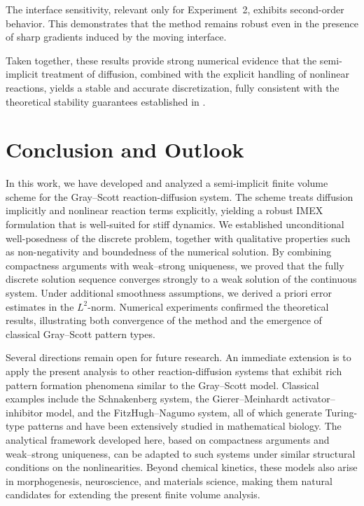 \documentclass[11pt, a4paper]{amsart}
\numberwithin{equation}{section}
\begin{document}
The interface sensitivity, relevant only for Experiment~2, exhibits second-order behavior. This demonstrates that the method remains robust even in the presence of sharp gradients induced by the moving interface.

Taken together, these results provide strong numerical evidence that the semi-implicit treatment of diffusion, combined with the explicit handling of nonlinear reactions, yields a stable and accurate discretization, fully consistent with the theoretical stability guarantees established in .

	
	
	\section{Conclusion and Outlook}\label{sec:conclusion}
	
	In this work, we have developed and analyzed a semi-implicit finite volume scheme for the Gray--Scott reaction-diffusion system. The scheme treats diffusion implicitly and nonlinear reaction terms explicitly, yielding a robust IMEX formulation that is well-suited for stiff dynamics. We established unconditional well-posedness of the discrete problem, together with qualitative properties such as non-negativity and boundedness of the numerical solution. By combining compactness arguments with weak--strong uniqueness, we proved that the fully discrete solution sequence converges strongly to a weak solution of the continuous system. Under additional smoothness assumptions, we derived a priori error estimates in the $L^2$-norm. Numerical experiments confirmed the theoretical results, illustrating both convergence of the method and the emergence of classical Gray--Scott pattern types.
	
	Several directions remain open for future research. An immediate extension is to apply the present analysis to other reaction-diffusion systems that exhibit rich pattern formation phenomena similar to the Gray--Scott model. Classical examples include the Schnakenberg system, the Gierer--Meinhardt activator--inhibitor model, and the FitzHugh--Nagumo system, all of which generate Turing-type patterns and have been extensively studied in mathematical biology. The analytical framework developed here, based on compactness arguments and weak--strong uniqueness, can be adapted to such systems under similar structural conditions on the nonlinearities. Beyond chemical kinetics, these models also arise in morphogenesis, neuroscience, and materials science, making them natural candidates for extending the present finite volume analysis.
\end{document}
